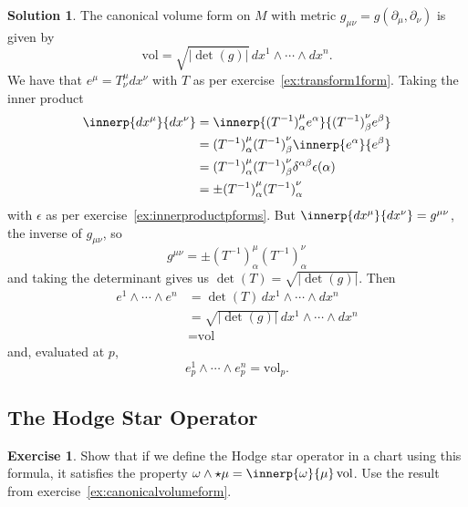 \documentclass[11pt, a4paper]{article}
\theoremstyle{definition}
\newtheorem{ex}{Exercise}[part]
\newtheorem{sol}{Solution}[part]
\begin{document}
\begin{sol}

The canonical volume form on $M$ with metric $g_{\mu\nu} = g(\partial_\mu, \partial_\nu)$ is given by
\[
    \text{vol} = \sqrt{|\det(g)|} \, dx^1 \wedge \cdots \wedge dx^n.
\]
We have that $e^\mu = T^\mu_\nu dx^\nu$ with $T$ as per exercise~\ref{ex:transform1form}. Taking the inner product
\begin{align*}
    \innerp{dx^\mu}{dx^\nu} &= \innerp{{(T^{-1})}^\mu_\alpha e^\alpha}{{(T^{-1})}^\nu_\beta e^\beta} \\
        &= {(T^{-1})}^\mu_\alpha {(T^{-1})}^\nu_\beta \innerp{e^\alpha}{e^\beta} \\
        &= {(T^{-1})}^\mu_\alpha {(T^{-1})}^\nu_\beta \delta^{\alpha\beta} \epsilon(\alpha) \\
        &= \pm {(T^{-1})}^\mu_\alpha {(T^{-1})}^\nu_\alpha
\end{align*}
with $\epsilon$ as per exercise~\ref{ex:innerproductpforms}.
But $\innerp{dx^\mu}{dx^\nu} = g^{\mu\nu}$, the inverse of $g_{\mu\nu}$, so
\[
g^{\mu\nu} = \pm {(T^{-1})}^\mu_\alpha {(T^{-1})}^\nu_\alpha
\]
and taking the determinant gives us $\det(T) = \sqrt{|\det(g)|}$. Then
\begin{align*}
    e^1 \wedge \cdots \wedge e^n &= \det(T) \, dx^1 \wedge \cdots \wedge dx^n \\
        &= \sqrt{|\det(g)|} \, dx^1 \wedge \cdots \wedge dx^n \\
        &= \text{vol}
\end{align*}
and, evaluated at $p$,
\[
e_p^1 \wedge \cdots \wedge e_p^n = \text{vol}_p.
\]

\end{sol}

\subsection{The Hodge Star Operator}

\begin{ex}

Show that if we define the Hodge star operator in a chart using this formula, it satisfies the property $\omega \wedge \star \mu = \innerp{\omega}{\mu} \, \text{vol}$. Use the result from exercise~\ref{ex:canonicalvolumeform}.

\end{ex}
\end{document}
